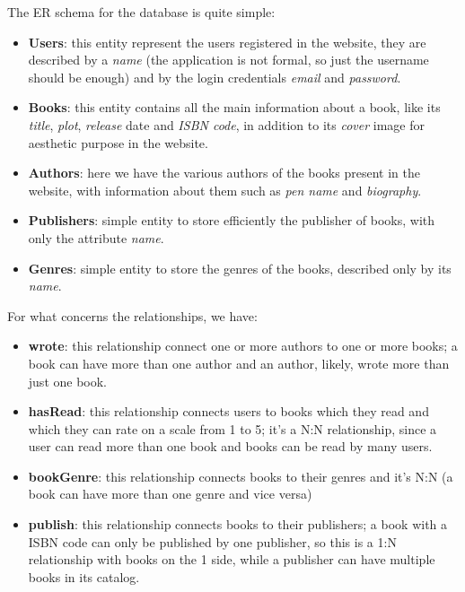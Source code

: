 The ER schema for the database is quite simple:
\begin{itemize}
    \item \textbf{Users}: this entity represent the users registered in the website, they are described by a \textit{name} (the application is not formal, so just the username should be enough) and by the login credentials \textit{email} and \textit{password}.
    \item \textbf{Books}: this entity contains all the main information about a book, like its \textit{title}, \textit{plot}, \textit{release} date and \textit{ISBN code}, in addition to its \textit{cover} image for aesthetic purpose in the website.
    \item \textbf{Authors}: here we have the various authors of the books present in the website, with information about them such as \textit{pen name} and \textit{biography}.
    \item \textbf{Publishers}: simple entity to store efficiently the publisher of books, with only the attribute \textit{name}.
    \item \textbf{Genres}: simple entity to store the genres of the books, described only by its \textit{name}.
\end{itemize}
For what concerns the relationships, we have:
\begin{itemize}
    \item \textbf{wrote}: this relationship connect one or more authors to one or more books; a book can have more than one author and an author, likely, wrote more than just one book.
    \item \textbf{hasRead}: this relationship connects users to books which they read and which they can rate on a scale from 1 to 5; it's a N:N relationship, since a user can read more than one book and books can be read by many users.
    \item \textbf{bookGenre}: this relationship connects books to their genres and it's N:N (a book can have more than one genre and vice versa)
    \item \textbf{publish}: this relationship connects books to their publishers; a book with a ISBN code can only be published by one publisher, so this is a 1:N relationship with books on the 1 side, while a publisher can have multiple books in its catalog.
\end{itemize}